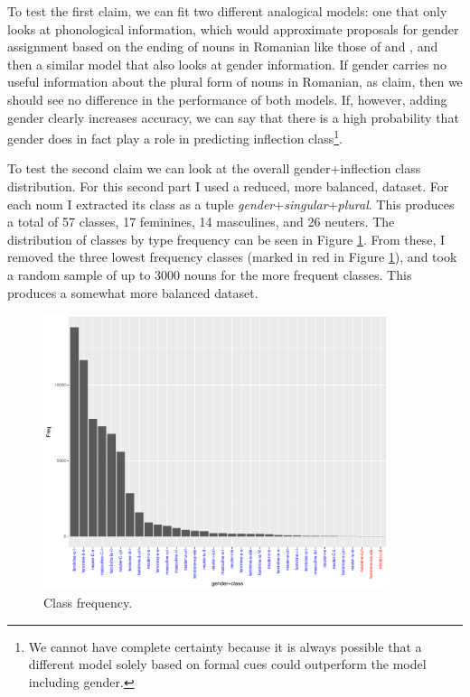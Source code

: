 To test the first claim, we can fit two different analogical models: one that only looks at phonological information, which would approximate proposals for gender assignment based on the ending of nouns in Romanian like those of \textcite{Vrabie.1989} and \textcite{Vrabie.2000}, and then a similar model that also looks at gender information. If gender carries no useful information about the plural form of nouns in Romanian, as \textcite{Bateman.2010} claim, then we should see no difference in the performance of both models. If, however, adding gender clearly increases accuracy, we can say that there is a high probability that gender does in fact play a role in predicting inflection class\footnote{We cannot have complete certainty because it is always possible that a different model solely based on formal cues could outperform the model including gender.}.

To test the second claim we can look at the overall gender+inflection class distribution. For this second part I used a reduced, more balanced, dataset. For each noun I extracted its class as a tuple \textit{gender}+\textit{singular}+\textit{plural}. This produces a total of 57 classes, 17 feminines, 14  masculines, and 26 neuters. The distribution of classes by type frequency can be seen in Figure \ref{fig:rumanian-classes}. From these, I removed the three lowest frequency classes (marked in red in Figure \ref{fig:rumanian-classes}), and took a random sample of up to 3000 nouns for the more frequent classes. This produces a somewhat more balanced dataset.

\begin{figure}[!ptbh]
  \centering
  \includegraphics[width=0.9\textwidth]{./figures/romanian/nclasses-plot.pdf}
  \caption{Class frequency.}\label{fig:rumanian-classes}
\end{figure}

